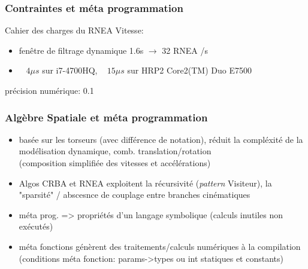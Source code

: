 \documentclass[10pt]{beamer}
\begin{document}
\begin{frame}
  \frametitle{Contraintes et méta programmation}

	\begin{block}{Cahier des charges du RNEA}
	Vitesse:
	\begin{itemize}
	\item fenêtre de filtrage dynamique 1.6s $\longrightarrow$ 32 RNEA /s
	\item < v > ~ $4\mu s$ sur i7-4700HQ, ~ $15\mu s$ sur HRP2 Core2(TM) Duo E7500
	\end{itemize}
	
	précision numérique: 0.1%
	\end{block}
	
\end{frame}

\begin{frame}
  \frametitle{Algèbre Spatiale et méta programmation}
  
  \begin{itemize}
  \item basée sur les torseurs (avec différence de notation), réduit la compléxité de la modélisation dynamique, comb. translation/rotation \\
        (composition simplifiée des vitesses et accélérations)
  \item Algos CRBA et RNEA exploitent la récursivité (\emph{pattern} Visiteur), la "sparsité" / abscesnce de couplage entre branches cinématiques
  \item méta prog. => propriétés d'un langage symbolique (calculs inutiles non exécutés)
  \item méta fonctions génèrent des traitements/calculs numériques à la compilation \\
        (conditions méta fonction: params->types ou int statiques et constants)
  \end{itemize}
  
\end{frame}
\end{document}

